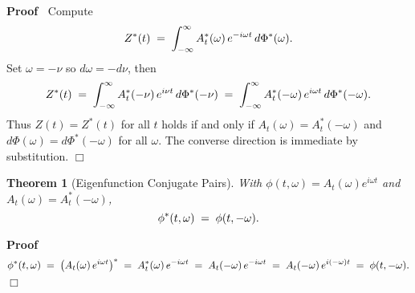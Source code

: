 \documentclass{article}
\newenvironment{proof}{\noindent\textbf{Proof\ }}{\hspace*{\fill}$\Box$\medskip}
\newtheorem{theorem}{Theorem}
\begin{document}
\begin{proof}
  Compute
  \[ Z^{\ast} (t) \hspace{0.27em} = \hspace{0.27em} \int_{- \infty}^{\infty}
     A_t^{\ast} (\omega)  \hspace{0.17em} e^{- i \omega t}  \hspace{0.17em} d
     \Phi^{\ast} (\omega) . \]
  Set $\omega = - \nu$ so $d \omega = - d \nu$, then
  \[ Z^{\ast} (t) \hspace{0.27em} = \hspace{0.27em} \int_{- \infty}^{\infty}
     A_t^{\ast}  (- \nu)  \hspace{0.17em} e^{i \nu t}  \hspace{0.17em} d
     \Phi^{\ast}  (- \nu) \hspace{0.27em} = \hspace{0.27em} \int_{-
     \infty}^{\infty} A_t^{\ast}  (- \omega)  \hspace{0.17em} e^{i \omega t} 
     \hspace{0.17em} d \Phi^{\ast}  (- \omega) . \]
  Thus $Z (t) = Z^{\ast} (t)$ for all $t$ holds if and only if $A_t (\omega) =
  A_t^{\ast}  (- \omega)$ and $d \Phi (\omega) = d \Phi^{\ast}  (- \omega)$
  for all $\omega$. The converse direction is immediate by substitution.
\end{proof}

\begin{theorem}[Eigenfunction Conjugate Pairs]
  With $\phi (t, \omega) = A_t (\omega) e^{i \omega t}$ and $A_t (\omega) =
  A_t^{\ast}  (- \omega)$,
  \[ \phi^{\ast} (t, \omega) \hspace{0.27em} = \hspace{0.27em} \phi (t, -
     \omega) . \]
\end{theorem}

\begin{proof}
  \[ \phi^{\ast} (t, \omega) \hspace{0.27em} = \hspace{0.27em} \left( A_t
     (\omega) \hspace{0.17em} e^{i \omega t} \right)^{\ast} \hspace{0.27em} =
     \hspace{0.27em} A_t^{\ast} (\omega)  \hspace{0.17em} e^{- i \omega t}
     \hspace{0.27em} = \hspace{0.27em} A_t  (- \omega)  \hspace{0.17em} e^{- i
     \omega t} \hspace{0.27em} = \hspace{0.27em} A_t  (- \omega) 
     \hspace{0.17em} e^{i (- \omega) t} \hspace{0.27em} = \hspace{0.27em} \phi
     (t, - \omega) . \]
\end{proof}
\end{document}
